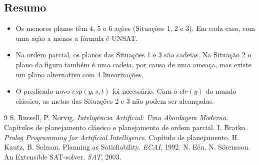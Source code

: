 \documentclass[11pt,a4paper]{article}
\newcommand{\clr}{\mathit{clr}}
\newcommand{\esp}{\mathit{esp}}
\begin{document}
\subsection{Resumo}
\begin{itemize}
  \item Os menores planos têm 4, 5 e 6 ações (Situações 1, 2 e 3). Em cada caso,
        com uma ação a menos a fórmula é UNSAT.
  \item Na ordem parcial, os planos das Situações 1 e 3 são cadeias. Na Situação 2
        o plano da figura também é uma cadeia, por causa de uma ameaça, mas existe
        um plano alternativo com 4 linearizações.
  \item O predicado novo $\esp(y,s,t)$ foi necessário. Com o $\clr(y)$ do mundo clássico, as
        metas das Situações 2 e 3 não podem ser alcançadas.
\end{itemize}

\begin{thebibliography}{9}
 S. Russell, P. Norvig. \emph{Inteligência Artificial: Uma Abordagem
  Moderna}. Capítulos de planejamento clássico e planejamento de ordem parcial.
 I. Bratko. \emph{Prolog Programming for Artificial Intelligence}.
  Capítulo de planejamento.
 H. Kautz, B. Selman. Planning as Satisfiability. \emph{ECAI}, 1992.
 N. Eén, N. Sörensson. An Extensible SAT-solver. \emph{SAT}, 2003.
\end{thebibliography}
\end{document}
